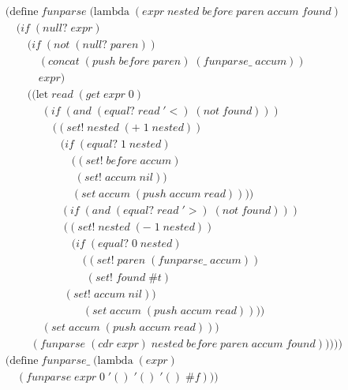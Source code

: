 \clearpage
\begin{figure}[ht]
\caption{}\label{scheme}
\begin{align*}
& (\text{define} \; funparse \; (\text{lambda} \; (expr \; nested \; before \; paren \; accum \; found) \; 
\\& \quad (if \; (null? \; expr)
\\& \qquad (if \; (not \; (null? \; paren))
\\& \qquad \quad (concat \; (push \; before \; paren) \; (funparse\_ \; accum))
\\& \qquad \quad expr)
\\& \qquad ((\text{let} \; read \; (get \; expr \; 0)
\\& \qquad \quad \; (if \; (and \; (equal? \; read \; '<) \; (not \; found)))
\\& \qquad \qquad \; ((set! \; nested \; (+ \; 1 \; nested))
\\& \qquad \qquad \quad (if \; (equal? \; 1 \; nested)
\\& \qquad \qquad \qquad ((set! \; before \; accum)
\\& \qquad \qquad \qquad \; (set! \; accum \; nil))
\\& \qquad \qquad \qquad (set \; accum \; (push \; accum \; read))))
\\& \qquad \qquad \quad (if \; (and \; (equal? \; read \; '>) \; (not \; found)))
\\& \qquad \qquad \quad \; ((set! \; nested \; (- \; 1 \; nested))
\\& \qquad \qquad \qquad (if \; (equal? \; 0 \; nested)
\\& \qquad \qquad \qquad \quad ((set! \; paren \; (funparse\_ \; accum))
\\& \qquad \qquad \qquad \quad \; (set! \; found \; \#t)
\\& \qquad \qquad \quad \; (set! \; accum \; nil))
\\& \qquad \qquad \qquad \quad (set \; accum \; (push \; accum \; read))))
\\& \qquad \quad \; (set \; accum \; (push \; accum \; read)))
\\& \qquad \; (funparse \; (cdr \; expr) \; nested \; before \; paren \; accum \; found)))))
\\& (\text{define} \; funparse\_ \; (\text{lambda} \; (expr)
\\& \quad (funparse \; expr \; 0 \; '() \; '() \; '() \; \#f))) \; 
\end{align*}
\end{figure}

